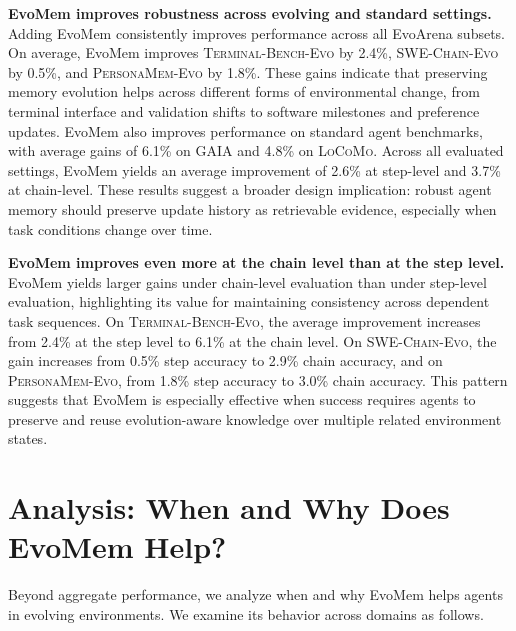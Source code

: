 \documentclass{article}
\begin{document}
\textbf{EvoMem improves robustness across evolving and standard settings.} 
Adding EvoMem consistently improves performance across all EvoArena subsets. On average, EvoMem improves \textsc{Terminal-Bench-Evo} by 2.4\%, \textsc{SWE-Chain-Evo} by 0.5\%, and \textsc{PersonaMem-Evo} by 1.8\%. These gains indicate that preserving memory evolution helps across different forms of environmental change, from terminal interface and validation shifts to software milestones and preference updates. EvoMem also improves performance on standard agent benchmarks, with average gains of 6.1\% on \textsc{GAIA} and 4.8\% on \textsc{LoCoMo}. Across all evaluated settings, EvoMem yields an average improvement of 2.6\% at step-level and 3.7\% at chain-level. These results suggest a broader design implication: robust agent memory should preserve update history as retrievable evidence, especially when task conditions change over time.










\textbf{EvoMem improves even more at the chain level than at the step level.}
EvoMem yields larger gains under chain-level evaluation than under step-level evaluation, highlighting its value for maintaining consistency across dependent task sequences. On \textsc{Terminal-Bench-Evo}, the average improvement increases from 2.4\% at the step level to 6.1\% at the chain level. On \textsc{SWE-Chain-Evo}, the gain increases from 0.5\% step accuracy to 2.9\% chain accuracy, and on \textsc{PersonaMem-Evo}, from 1.8\% step accuracy to 3.0\% chain accuracy. This pattern suggests that EvoMem is especially effective when success requires agents to preserve and reuse evolution-aware knowledge over multiple related environment states.
















\section{Analysis: When and Why Does EvoMem Help?}
\label{sec:diagnostic_analysis}

Beyond aggregate performance, we analyze when and why EvoMem helps agents in evolving environments. We examine its behavior across domains as follows.
\end{document}
